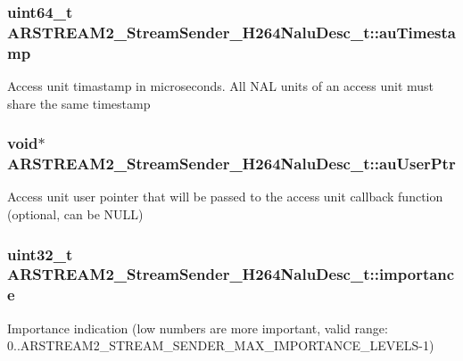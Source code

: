 \subsubsection[{\texorpdfstring{au\+Timestamp}{auTimestamp}}]{\setlength{\rightskip}{0pt plus 5cm}uint64\+\_\+t A\+R\+S\+T\+R\+E\+A\+M2\+\_\+\+Stream\+Sender\+\_\+\+H264\+Nalu\+Desc\+\_\+t\+::au\+Timestamp}\hypertarget{struct_a_r_s_t_r_e_a_m2___stream_sender___h264_nalu_desc__t_a37bcb9ea4961e06e84080eb5558bd7d2}{}\label{struct_a_r_s_t_r_e_a_m2___stream_sender___h264_nalu_desc__t_a37bcb9ea4961e06e84080eb5558bd7d2}
Access unit timastamp in microseconds. All N\+AL units of an access unit must share the same timestamp 
\subsubsection[{\texorpdfstring{au\+User\+Ptr}{auUserPtr}}]{\setlength{\rightskip}{0pt plus 5cm}void$\ast$ A\+R\+S\+T\+R\+E\+A\+M2\+\_\+\+Stream\+Sender\+\_\+\+H264\+Nalu\+Desc\+\_\+t\+::au\+User\+Ptr}\hypertarget{struct_a_r_s_t_r_e_a_m2___stream_sender___h264_nalu_desc__t_a5528fa014c61360c0abd01775f23ec9d}{}\label{struct_a_r_s_t_r_e_a_m2___stream_sender___h264_nalu_desc__t_a5528fa014c61360c0abd01775f23ec9d}
Access unit user pointer that will be passed to the access unit callback function (optional, can be N\+U\+LL) 
\subsubsection[{\texorpdfstring{importance}{importance}}]{\setlength{\rightskip}{0pt plus 5cm}uint32\+\_\+t A\+R\+S\+T\+R\+E\+A\+M2\+\_\+\+Stream\+Sender\+\_\+\+H264\+Nalu\+Desc\+\_\+t\+::importance}\hypertarget{struct_a_r_s_t_r_e_a_m2___stream_sender___h264_nalu_desc__t_a7b59e4dee14c0d06622c6b1e7dd39b77}{}\label{struct_a_r_s_t_r_e_a_m2___stream_sender___h264_nalu_desc__t_a7b59e4dee14c0d06622c6b1e7dd39b77}
Importance indication (low numbers are more important, valid range\+: 0..A\+R\+S\+T\+R\+E\+A\+M2\+\_\+\+S\+T\+R\+E\+A\+M\+\_\+\+S\+E\+N\+D\+E\+R\+\_\+\+M\+A\+X\+\_\+\+I\+M\+P\+O\+R\+T\+A\+N\+C\+E\+\_\+\+L\+E\+V\+E\+L\+S-\/1) 
